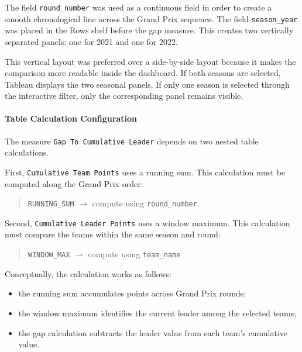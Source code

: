 \documentclass[12pt,a4paper]{article}
\begin{document}
	The field \texttt{round\_number} was used as a continuous field in order to create a smooth chronological line across the Grand Prix sequence.
	The field \texttt{season\_year} was placed in the Rows shelf before the gap measure.
	This creates two vertically separated panels: one for 2021 and one for 2022.
	
	This vertical layout was preferred over a side-by-side layout because it makes the comparison more readable inside the dashboard.
	If both seasons are selected, Tableau displays the two seasonal panels.
	If only one season is selected through the interactive filter, only the corresponding panel remains visible.
	
	\paragraph{Table Calculation Configuration}
	
	The measure \texttt{Gap To Cumulative Leader} depends on two nested table calculations.
	
	First, \texttt{Cumulative Team Points} uses a running sum.
	This calculation must be computed along the Grand Prix order:
	
	\begin{quote}
		\texttt{RUNNING\_SUM} $\rightarrow$ compute using \texttt{round\_number}
	\end{quote}
	
	Second, \texttt{Cumulative Leader Points} uses a window maximum.
	This calculation must compare the teams within the same season and round:
	
	\begin{quote}
		\texttt{WINDOW\_MAX} $\rightarrow$ compute using \texttt{team\_name}
	\end{quote}
	
	Conceptually, the calculation works as follows:
	
	\begin{itemize}[leftmargin=1.2cm]
		\item the running sum accumulates points across Grand Prix rounds;
		\item the window maximum identifies the current leader among the selected teams;
		\item the gap calculation subtracts the leader value from each team's cumulative value.
	\end{itemize}
	
\end{document}
